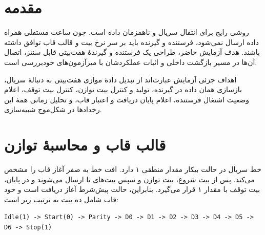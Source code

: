 \newsavebox{\dsdlcodebox}
\newenvironment{dsdlcodeblock}
{%
  \par\noindent
  \begin{latin}
  \begin{lrbox}{\dsdlcodebox}
  \begin{minipage}{0.94\linewidth}
  \small
}
{%
  \end{minipage}
  \end{lrbox}
  \setlength{\fboxsep}{6pt}
  \fcolorbox{dsdlcodeborder}{dsdlcodebg}{\usebox{\dsdlcodebox}}
  \end{latin}
  \par
}

\section{مقدمه}

 روشی رایج برای انتقال سریال و ناهمزمان داده است. چون
ساعت مستقلی همراه داده ارسال نمی‌شود،
فرستنده و گیرنده باید بر سر
نرخ بیت و قالب قاب توافق داشته باشند.
هدف آزمایش حاضر، طراحی یک فرستنده و گیرندهٔ هفت‌بیتی قابل
سنتز، اتصال آن‌ها در مسیر بازگشت
داخلی و اثبات عملکردشان با
میزآزمون‌های خودبررسی است.

اهداف جزئی آزمایش عبارت‌اند از تبدیل دادهٔ موازی هفت‌بیتی به
دنبالهٔ سریال، بازسازی همان
داده در گیرنده، تولید و کنترل بیت توازن، کنترل بیت
توقف، اعلام وضعیت اشتغال فرستنده، اعلام
پایان دریافت و اعتبار قاب، و تحلیل زمانی
همهٔ این رخدادها در شکل‌موج شبیه‌سازی.


\section{قالب قاب و محاسبهٔ توازن}

خط سریال در حالت بیکار مقدار منطقی ۱ دارد. افت خط به صفر آغاز
قاب را مشخص می‌کند. پس از بیت شروع، بیت توازن و سپس بیت‌های
 تا  ارسال می‌شوند و در پایان، بیت توقف
با مقدار ۱ قرار می‌گیرد. بنابراین، حالت  پیش‌شرط آغاز دریافت است و خود قاب شامل
ده بیت به ترتیب زیر است:

\begin{latin}
\begin{center}
\texttt{Idle(1) -> Start(0) -> Parity -> D0 -> D1 -> D2 -> D3 -> D4 -> D5 -> D6 -> Stop(1)}
\end{center}
\end{latin}

